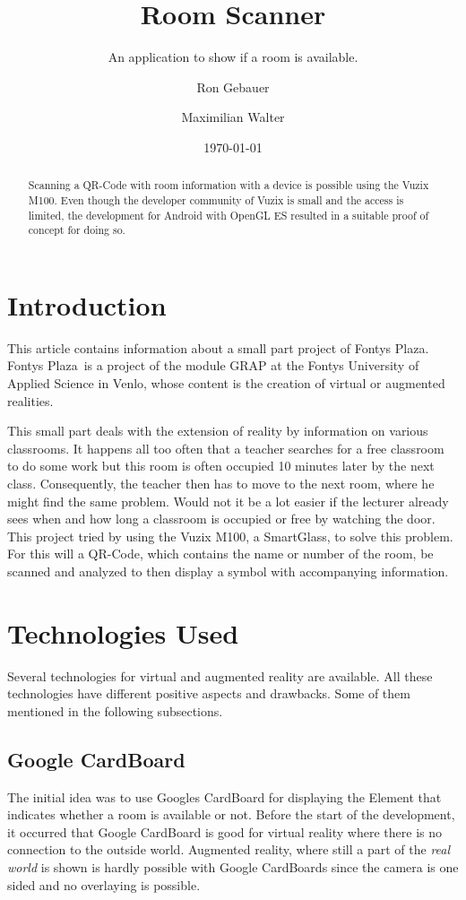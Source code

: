\documentclass[11pt]{scrartcl}
\title{Room Scanner}
\subtitle{An application to show if a room is available.}
\author{Ron Gebauer \and Maximilian Walter}
\date{\today}
\begin{document}
\maketitle

\begin{abstract}
	Scanning a QR-Code with room information with a device is possible using the Vuzix M100. Even though the developer community of Vuzix is small and the access is limited, the development for Android with OpenGL ES resulted in a suitable proof of concept for doing so. 
\end{abstract}

\begin{multicols}{2}
	\section{Introduction}
	This article contains information about a small part project of \glqq Fontys Plaza\grqq. \glqq Fontys Plaza\grqq\ is a project of the module GRAP at the Fontys University of Applied Science in Venlo, whose content is the creation of virtual or augmented realities.
	
	This small part deals with the extension of reality by information on various classrooms. It happens all too often that a teacher searches for a free classroom to do some work but this room is often occupied 10 minutes later by the next class. Consequently, the teacher then has to move to the next room, where he might find the same problem. Would not it be a lot easier if the lecturer already sees when and how long a classroom is occupied or free by watching the door.
	This project tried by using the Vuzix M100, a SmartGlass, to solve this problem. For this will a QR-Code, which contains the name or number of the room, be scanned and analyzed to then display a symbol with accompanying information.
	
	\section{Technologies Used}
	Several technologies for virtual and augmented reality are available. All these technologies have different positive aspects and drawbacks. Some of them mentioned in the following subsections.
		\subsection{Google CardBoard}
			The initial idea was to use Googles CardBoard for displaying the Element that indicates whether a room is available or not. Before the start of the development, it occurred that Google CardBoard is good for virtual reality where there is no connection to the outside world. Augmented reality, where still a part of the \emph{real world} is shown is hardly possible with Google CardBoards since the camera is one sided and no overlaying is possible.
	

\end{multicols}
\end{document}
